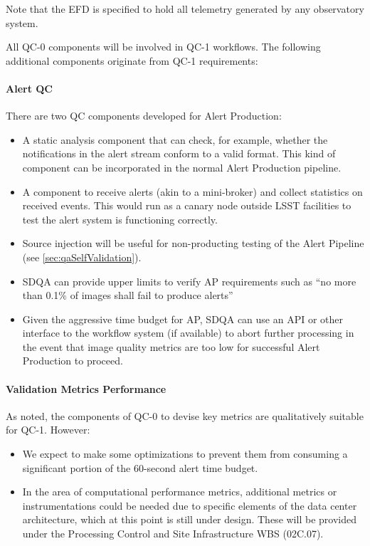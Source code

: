 Note that the EFD is specified to hold all telemetry generated by any observatory system.

All QC-0 components will be involved in QC-1 workflows. The following additional components originate from QC-1 requirements:

\paragraph{Alert QC}
\label{sec:qaAlertQA}

There are two QC components developed for Alert Production:

\begin{itemize}

\item A static analysis component that can check, for example, whether the notifications in the alert stream conform to a valid format. This kind of component can be incorporated in the normal Alert Production pipeline.

\item A component to receive alerts (akin to a mini-broker) and collect statistics on received events. This would run as a canary node outside LSST facilities to test the alert system is functioning correctly.

\item Source injection will be useful for non-producting testing of the Alert Pipeline (see \ref{sec:qaSelfValidation}).

\item SDQA can provide upper limits to verify AP requirements such as ``no more than 0.1\% of images shall fail to produce alerts''

\item Given the aggressive time budget for AP, SDQA can use an API or other interface to the workflow system (if available) to abort further processing in the event that image quality metrics are too low for successful Alert Production to proceed.

\end{itemize}

\paragraph{Validation Metrics Performance}
\label{sec:qaPerfValidate}

As noted, the components of QC-0 to devise key metrics are qualitatively suitable for QC-1. However:

\begin{itemize}

\item We expect to make some optimizations to prevent them from consuming a significant portion of the 60-second alert time budget.

\item In the area of computational performance metrics, additional metrics or instrumentations could be needed due to specific elements of the data center architecture, which at this point is still under design. These will be provided under the Processing Control and Site Infrastructure WBS (02C.07).

\end{itemize}

